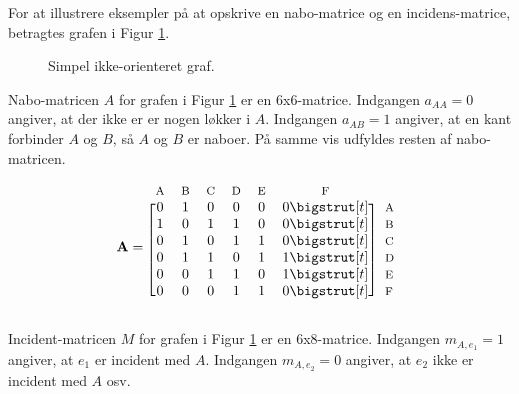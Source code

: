 \begin{exmp}
	For at illustrere eksempler på at opskrive en nabo-matrice og en incidens-matrice, betragtes grafen i Figur \ref{fig:simple_graph_labels}. 
	
	\begin{figure}[h!]
		\centering
		
		\caption{Simpel ikke-orienteret graf.} \label{fig:simple_graph_labels}
	\end{figure}
	
	Nabo-matricen $A$ for grafen i Figur \ref{fig:simple_graph_labels} er en $6$x$6$-matrice.
	Indgangen $a_{AA}=0$ angiver, at der ikke er er nogen løkker i $A$.
	Indgangen $a_{AB}=1$ angiver, at en kant forbinder $A$ og $B$, så $A$ og $B$ er naboer.
	På samme vis udfyldes resten af nabo-matricen. 
	
	 \begin{equation*}
	  \mathbf{A}=
	  \begin{blockarray}{*{6}{c} l}
	    \begin{block}{*{6}{>{$\footnotesize}c<{$}} l}
	      A & B & C & D & E & F \\
	    \end{block}
	    \begin{block}{[*{6}{c}]>{$\footnotesize}l<{$}}
	      0 & 1 & 0 & 0 & 0 & 0 \bigstrut[t]& A \\
	      1 & 0 & 1 & 1 & 0 & 0 \bigstrut[t]&B \\
	      0 & 1 & 0 & 1 & 1 & 0 \bigstrut[t]&C \\
	      0 & 1 & 1 & 0 & 1 & 1 \bigstrut[t]& D \\
	      0 & 0 & 1 & 1 & 0 & 1 \bigstrut[t]& E \\
	      0 & 0 & 0 & 1 & 1 & 0 \bigstrut[t]& F \\
	    \end{block}
	  \end{blockarray}
	\end{equation*} 
	
	Incident-matricen $M$ for grafen i Figur \ref{fig:simple_graph_labels} er en $6$x$8$-matrice.
	Indgangen $m_{A,e_1}=1$ angiver, at $e_1$ er incident med $A$.
	Indgangen $m_{A,e_2}=0$ angiver, at $e_2$ ikke er incident med $A$ osv.
	

\end{exmp}
